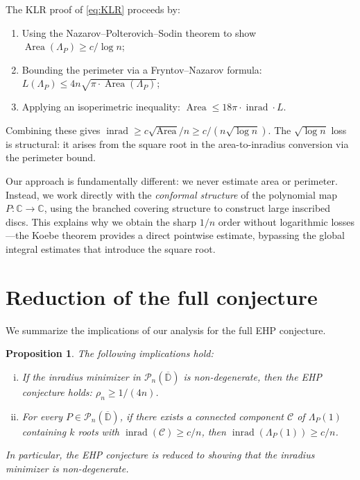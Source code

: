 \documentclass[11pt,a4paper]{amsart}
\newtheorem{proposition}[theorem]{Proposition}
\theoremstyle{definition}
\newcommand{\D}{\mathbb{D}}
\newcommand{\C}{\mathbb{C}}
\newcommand{\Pn}{\mathcal{P}_n}
\newcommand{\inrad}{\operatorname{inrad}}
\begin{document}
The KLR proof of \eqref{eq:KLR} proceeds by:
\begin{enumerate}[(1)]
  \item Using the Nazarov--Polterovich--Sodin theorem to show
    $\operatorname{Area}(\Lambda_P) \geq c/\log n$;
  \item Bounding the perimeter via a Fryntov--Nazarov formula:
    $L(\Lambda_P) \leq 4n\sqrt{\pi \cdot \operatorname{Area}(\Lambda_P)}$;
  \item Applying an isoperimetric inequality:
    $\operatorname{Area} \leq 18\pi \cdot \inrad \cdot L$.
\end{enumerate}
Combining these gives $\inrad \geq c\sqrt{\operatorname{Area}}/n \geq c/(n\sqrt{\log n})$.
The $\sqrt{\log n}$ loss is structural: it arises from the square root
in the area-to-inradius conversion via the perimeter bound.

Our approach is fundamentally different: we never estimate area or
perimeter.  Instead, we work directly with the \emph{conformal structure}
of the polynomial map $P \colon \C \to \C$, using the branched covering
structure to construct large inscribed discs.  This explains why we obtain
the sharp $1/n$ order without logarithmic losses---the Koebe theorem
provides a direct pointwise estimate, bypassing the global integral
estimates that introduce the square root.

\section{Reduction of the full conjecture}

We summarize the implications of our analysis for the full EHP conjecture.

\begin{proposition}\label{prop:reduction}
The following implications hold:
\begin{enumerate}[(i)]
  \item If the inradius minimizer in $\Pn(\overline{\D})$
    is non-degenerate, then the EHP conjecture holds:
    $\rho_n \geq 1/(4n)$.
  \item For every $P \in \Pn(\overline{\D})$, if there exists a
    connected component $\mathcal{C}$ of $\Lambda_P(1)$ containing
    $k$ roots with $\inrad(\mathcal{C}) \geq c/n$, then
    $\inrad(\Lambda_P(1)) \geq c/n$.
\end{enumerate}
In particular, the EHP conjecture is reduced to showing that
the inradius minimizer is non-degenerate.
\end{proposition}
\end{document}

